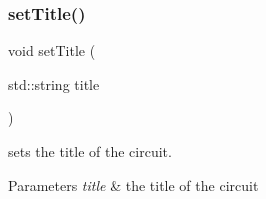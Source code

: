 \subsubsection{\texorpdfstring{set\+Title()}{setTitle()}}
{\footnotesize\ttfamily void set\+Title (\begin{DoxyParamCaption}\item[{std\+::string}]{title }\end{DoxyParamCaption})\hspace{0.3cm}{\ttfamily [inline]}}



sets the title of the circuit. 


\begin{DoxyParams}{Parameters}
{\em title} & the title of the circuit \\
\hline
\end{DoxyParams}
